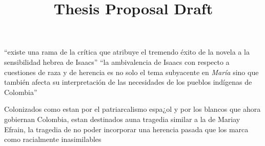\documentclass[12pt]{article}
\title{Thesis Proposal Draft}
\makeatletter
\newcommand\iraggedright{%
	\let\\\@centercr\@rightskip\@flushglue \rightskip\@rightskip
	\leftskip\z@skip}
\makeatother
\begin{document}
	\makeheader
	\iraggedright

\enquote{existe una rama de la crítica que atribuye el tremendo éxito de la novela a la sensibilidad hebrea de Isaacs} 
\enquote{la ambivalencia de Isaacs con respecto a cuestiones de raza y de herencia es no solo el tema subyacente en \textit{María} sino que también afecta su interpretación de las necesidades de los pueblos indígenas de Colombia}

 Colonizados como estan por
 el patriarcalismo espa¿ol y por los blancos que ahora gobiernan
 Colombia, estan destinados auna tragedia similar a la de Mariay Efrain,
 la tragedia de no poder incorporar una herencia pasada que los marca
 como racialmente inasimilables
\end{document}
